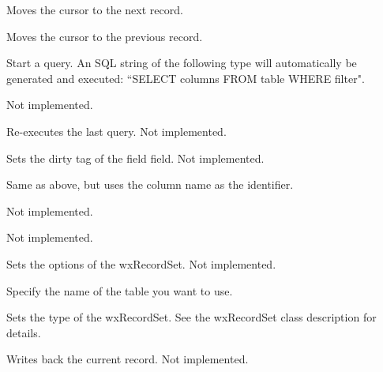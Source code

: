 Moves the cursor to the next record.
  
\label{wxrecordsetmoveprev}


Moves the cursor to the previous record.
  


Start a query. An SQL string of the following type will automatically be
generated and executed: ``SELECT columns FROM table WHERE filter".



Not implemented.
  


Re-executes the last query. Not implemented.



Sets the dirty tag of the field field. Not implemented.


Same as above, but uses the column name as the identifier.



Not implemented.



Not implemented.



Sets the options of the wxRecordSet. Not implemented.
  


Specify the name of the table you want to use.
  


Sets the type of the wxRecordSet. See the wxRecordSet class description for details.



Writes back the current record. Not implemented.


